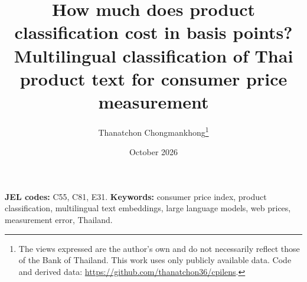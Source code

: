 \documentclass[11pt,a4paper]{article}
\title{How much does product classification cost in basis points?\\[0.3em]
\large Multilingual classification of Thai product text for consumer price measurement}
\author{Thanatchon Chongmankhong\thanks{The views expressed are the author's own and do not
necessarily reflect those of the Bank of Thailand. This work uses only publicly available data.
Code and derived data: \url{https://github.com/thanatchon36/cpilens}.}}
\date{October 2026}
\begin{document}
\maketitle

\begin{abstract}

\end{abstract}

\noindent\textbf{JEL codes:} C55, C81, E31.\quad %
\textbf{Keywords:} consumer price index, product classification, multilingual text embeddings,
large language models, web prices, measurement error, Thailand.













\appendix

\end{document}
